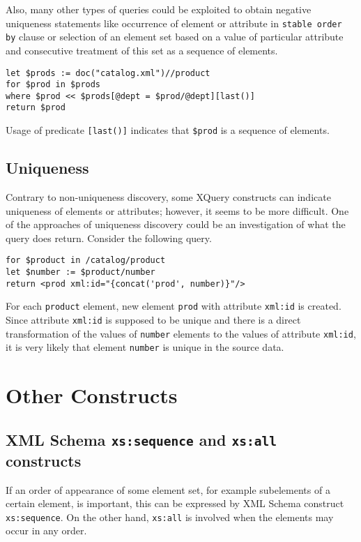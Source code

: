 Also, many other types of queries could be exploited to obtain negative uniqueness statements like occurrence of element or attribute in \texttt{stable order by} clause or selection of an element set based on a value of particular attribute and consecutive treatment of this set as a sequence of elements.

\begin{verbatim}
let $prods := doc("catalog.xml")//product 
for $prod in $prods 
where $prod << $prods[@dept = $prod/@dept][last()] 
return $prod 
\end{verbatim}

Usage of predicate \texttt{[last()]} indicates that \texttt{\$prod} is a sequence of elements. 

\subsection{Uniqueness}
Contrary to non-uniqueness discovery, some XQuery constructs can indicate uniqueness of elements or attributes; however, it seems to be more difficult. One of the approaches of uniqueness discovery could be an investigation of what the query does return. Consider the following query.

\begin{verbatim}
for $product in /catalog/product
let $number := $product/number
return <prod xml:id="{concat('prod', number)}"/>
\end{verbatim}

For each \texttt{product} element, new element \texttt{prod} with attribute \texttt{xml:id} is created. Since attribute \texttt{xml:id} is supposed to be unique and there is a direct transformation of the values of \texttt{number} elements to the values of attribute \texttt{xml:id}, it is very likely that element \texttt{number} is unique in the source data.

\section{Other Constructs}

\subsection{XML Schema \texttt{xs:sequence} and \texttt{xs:all} constructs}
If an order of appearance of some element set, for example subelements of a certain element, is important, this can be expressed by XML Schema construct \texttt{xs:sequence}. On the other hand, \texttt{xs:all} is involved when the elements may occur in any order.

